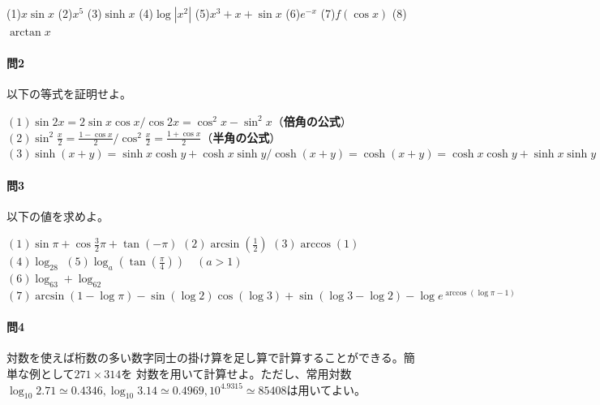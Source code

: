 \documentclass[a4j,dvipdfmx]{jsarticle}
\begin{document}
                \noindent
                (1)$x\sin x$\hspace{3mm}
                (2)$x^5$\hspace{3mm}
                (3)$\sinh x$\hspace{3mm}
                (4)$\log|x^2|$\hspace{3mm}
                (5)$x^3+x+\sin x$\hspace{3mm}
                (6)$e^{-x}$\hspace{3mm}
                (7)$f(\cos x)$\hspace{3mm}
                (8)$\arctan x$

                \paragraph{問2}以下の等式を証明せよ。

                \noindent
                $(1)\sin 2x=2\sin x\cos x/\cos 2x=\cos^2 x-\sin^2 x$（\textbf{倍角の公式}）\\
                $(2)\displaystyle \sin^2\frac{x}{2}=\frac{1-\cos x}{2}/\cos^2\frac{x}{2}=\frac{1+\cos x}{2}$（\textbf{半角の公式}）\\
                $(3)\sinh(x+y)=\sinh x\cosh y + \cosh x\sinh y/\cosh(x+y)=\cosh(x+y)=\cosh x\cosh y + \sinh x\sinh y$\\
                
                \paragraph{問3}以下の値を求めよ。

                \noindent
                $(1)\sin \pi+\cos \frac{3}{2}\pi + \tan(-\pi)$\hspace{3mm}
                $(2)\arcsin(\frac{1}{2})$\hspace{3mm}
                $(3)\arccos(1)$\hspace{3mm}
                $(4)\log_28$\hspace{3mm}
                $(5)\log_a(\tan(\frac{\pi}{4}))\quad(a>1)$\\
                $(6)\log_63+\log_62$\hspace{3mm}
                $(7)\arcsin(1-\log\pi)-\sin(\log2)\cos(\log 3)+\sin(\log3 -\log 2)-\log e^{\arccos(\log \pi-1)}$

                \paragraph{問4}対数を使えば桁数の多い数字同士の掛け算を足し算で計算することができる。簡単な例として$271\times 314$を
                対数を用いて計算せよ。ただし、常用対数$\log_{10} 2.71\simeq0.4346,\log_{10} 3.14\simeq0.4969,10^{4.9315}\simeq85408$は用いてよい。
                
\end{document}

